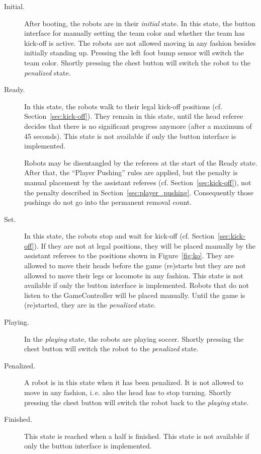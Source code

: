 \documentclass[12pt]{article}
\newcommand{\ie}{\mbox{i.\,e.}\xspace}
\newcommand{\cf}{\mbox{cf.}\xspace}
\newcommand{\KickOffAutoTime}{45 seconds\xspace}
\begin{document}
\begin{description}

\item[Initial.] After booting, the robots are in their \emph{initial} state. In this state, the button interface for manually setting the team color and whether the team has kick-off is active. The robots are not allowed moving in any fashion besides initially standing up. Pressing the left foot bump sensor will switch the team color. Shortly pressing the chest button will switch the robot to the \emph{penalized} state.

\item[Ready.] In this state, the robots walk to their legal kick-off positions (\cf Section~\ref{sec:kick-off}). They remain in this state, until the head referee decides that there is no significant progress anymore (after a maximum of \KickOffAutoTime). This state is not available if only the button interface is implemented.

Robots may be disentangled by the referees at the start of the Ready state. After that, 
the ``Player Pushing'' rules are applied, but the penalty is manual placement by the assistant referees (\cf Section~\ref{sec:kick-off}), not the penalty described in Section~\ref{sec:player_pushing}.
Consequently those pushings do not go into the permanent removal count.

\item[Set.] In this state, the robots stop and wait for kick-off (\cf Section~\ref{sec:kick-off}). If they are not at legal positions, they will be placed manually by the assistant referees to the positions shown in Figure~\ref{fig:ko}. They are allowed to move their heads before the game (re)starts but they are not allowed to move their legs or locomote in any fashion. This state is not available if only the button interface is implemented. Robots that do not listen to the GameController will be placed manually. Until the game is (re)started, they are in the \emph{penalized} state.

\item[Playing.] In the \emph{playing} state, the robots are playing soccer. Shortly pressing the chest button will switch the robot to the \emph{penalized} state.

\item[Penalized.] A robot is in this state when it has been penalized. It is not allowed to move in any fashion, \ie also the head has to stop turning. Shortly pressing the chest button will switch the robot back to the \emph{playing} state.

\item[Finished.] This state is reached when a half is finished. This state is not available if only the button interface is implemented.

\end{description}
\end{document}
